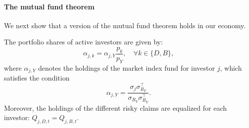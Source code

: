 \paragraph{The mutual fund theorem}

We next show that a version of the mutual fund theorem holds in our economy.

\begin{lemma}\label{lemma:mutual_fund_theorem}
    The portfolio shares of active investors are given by:
    \begin{equation}
        \alpha_{j,k} = \alpha_{j,Y} \frac{p_k}{p_Y}, \quad \forall k \in \{D,B\},
    \end{equation}
    where $\alpha_{j,Y}$ denotes the holdings of the market index fund for investor $j$, which satisfies the condition
    \begin{equation}
        \alpha_{j,Y}  = \frac{\sigma_{j} \sigma_{R_Y}^\top}{\sigma_{R_Y} \sigma_{R_Y}^\top}.
    \end{equation}
    Moreover, the holdings of the different risky claims are equalized for each investor: $Q_{j,D,t} = Q_{j,B,t}$.
\end{lemma} 

